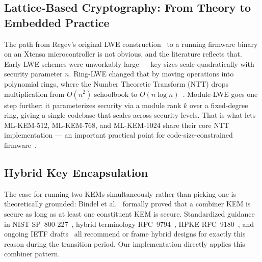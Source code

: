 \documentclass[journal, 10pt]{IEEEtran}
\begin{document}
\subsection{Lattice-Based Cryptography: From Theory to Embedded Practice}
The path from Regev's original LWE construction~\cite{b3} to a running firmware binary on an Xtensa microcontroller is not obvious, and the literature reflects that. Early LWE schemes were unworkably large — key sizes scale quadratically with security parameter $n$. Ring-LWE changed that by moving operations into polynomial rings, where the Number Theoretic Transform (NTT) drops multiplication from $O(n^2)$ schoolbook to $O(n \log n)$~\cite{b13,b26,b28}. Module-LWE goes one step further: it parameterizes security via a module rank $k$ over a fixed-degree ring, giving a single codebase that scales across security levels. That is what lets ML-KEM-512, ML-KEM-768, and ML-KEM-1024 share their core NTT implementation — an important practical point for code-size-constrained firmware~\cite{b2,b28}.

\subsection{Hybrid Key Encapsulation}
The case for running two KEMs simultaneously rather than picking one is theoretically grounded: Bindel et al.~\cite{b8} formally proved that a combiner KEM is secure as long as at least one constituent KEM is secure. Standardized guidance in NIST SP~800-227~\cite{b9}, hybrid terminology RFC~9794~\cite{b31}, HPKE RFC~9180~\cite{b32}, and ongoing IETF drafts~\cite{b16,b17} all recommend or frame hybrid designs for exactly this reason during the transition period. Our implementation directly applies this combiner pattern.
\end{document}
